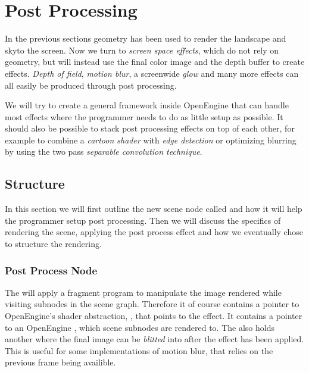 \chapter{Post Processing}
\label{chap:pp}


In the previous sections geometry has been used to render the
landscape and skyto the screen. Now we turn to \emph{screen space
  effects}, which do not rely on geometry, but will instead use the
final color image and the depth buffer to create effects. \emph{Depth
  of field}, \emph{motion blur}, a screenwide \emph{glow} and many
more effects can all easily be produced through post processing.


We will try to create a general framework inside OpenEngine that can
handle most effects where the programmer needs to do as little setup
as possible. It should also be possible to stack post processing
effects on top of each other, for example to combine a \emph{cartoon
  shader} with \emph{edge detection} or optimizing blurring by using
the two pass \emph{separable convolution technique}.

\section{Structure}

In this section we will first outline the new scene node called
 and how it will help the programmer setup post
processing. Then we will discuss the specifics of rendering the scene,
applying the post process effect and how we eventually chose to
structure the rendering.

\subsection*{Post Process Node}

The  will apply a fragment program to
manipulate the image rendered while visiting subnodes in the scene
graph. Therefore it of course contains a pointer to OpenEngine's
shader abstraction, , that points to the
effect. It contains a pointer to an OpenEngine ,
which scene subnodes are rendered to. The  also
holds another  where the final image can be
\emph{blitted} into after the effect has been applied. This is useful
for some implementations of motion blur, that relies on the previous
frame being availible.

